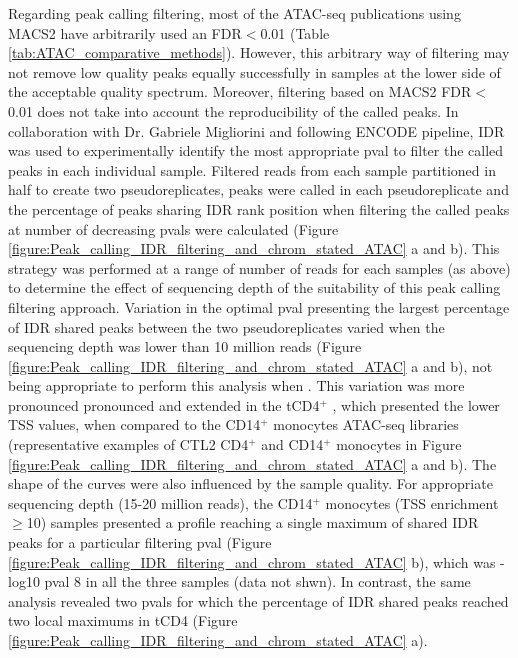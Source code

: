 Regarding peak calling filtering, most of the ATAC-seq publications using MACS2 have arbitrarily used an FDR$<$0.01 (Table \ref{tab:ATAC_comparative_methods}). However, this arbitrary way of filtering may not remove low quality peaks equally successfully in samples at the lower side of the acceptable quality spectrum. Moreover, filtering based on MACS2 FDR$<$0.01 does not take into account the reproducibility of the called peaks. In collaboration with Dr. Gabriele Migliorini and following ENCODE pipeline, IDR was used to experimentally identify the most appropriate pval to filter the called peaks in each individual sample. Filtered reads from each sample partitioned in half to create two pseudoreplicates, peaks were called in each pseudoreplicate and the percentage of peaks sharing IDR rank position when filtering the called peaks at number of decreasing pvals were calculated (Figure \ref{figure:Peak_calling_IDR_filtering_and_chrom_stated_ATAC} a and b). This strategy was performed at a range of number of reads for each samples (as above) to determine the effect of sequencing depth of the suitability of this peak calling filtering approach. Variation in the optimal pval presenting the largest percentage of IDR shared peaks between the two pseudoreplicates varied when the sequencing depth was lower than 10 million reads (Figure \ref{figure:Peak_calling_IDR_filtering_and_chrom_stated_ATAC} a and b), not being appropriate to perform this analysis when . This variation was more pronounced pronounced and extended in the tCD4$^+$ , which presented the lower TSS values, when compared to the CD14$^+$ monocytes ATAC-seq libraries (representative examples of CTL2 CD4$^+$ and CD14$^+$ monocytes in Figure \ref{figure:Peak_calling_IDR_filtering_and_chrom_stated_ATAC} a and b). The shape of the curves were also influenced by the sample quality. For appropriate sequencing depth (15-20 million reads), the CD14$^+$ monocytes (TSS enrichment $\geq$10) samples presented a profile reaching a single maximum of shared IDR peaks for a particular filtering pval (Figure \ref{figure:Peak_calling_IDR_filtering_and_chrom_stated_ATAC} b), which was -log10 pval 8 in all the three samples (data not shwn). In contrast, the same analysis revealed two pvals for which the percentage of IDR shared peaks reached two local maximums in tCD4 (Figure \ref{figure:Peak_calling_IDR_filtering_and_chrom_stated_ATAC} a). 



